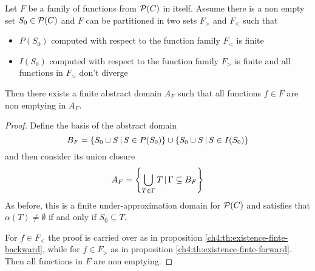 \begin{theorem}\label{ch4:th:existence-finite-backward-forward}
	Let $F$ be a family of functions from $\mathcal{P}(C)$ in itself. Assume there is a non empty set $S_0 \in \mathcal{P}(C)$ and $F$ can be partitioned in two sets $F_{>}$ and $F_{<}$ such that
	\begin{itemize}
		\item $P(S_0)$ computed with respect to the function family $F_{<}$ is finite
		\item $I(S_0)$ computed with respect to the function family $F_{>}$ is finite and all functions in  $F_{>}$ don't diverge
	\end{itemize}
	Then there exists a finite abstract domain $A_F$ such that all functions $f \in F$ are non emptying in $A_F$.
\end{theorem}
\begin{proof}
	Define the basis of the abstract domain
	\[
	B_F = \{ S_0 \cup S \,\vert\, S \in P(S_0) \} \cup \{ S_0 \cup S \,\vert\, S \in I(S_0) \}
	\]
	and then consider its union closure
	\[
	A_F = \left\lbrace \bigcup\limits_{T \in \Gamma} T \,\vert\, \Gamma \subseteq B_F \right\rbrace
	\]
	As before, this is a finite under-approximation domain for $\mathcal{P}(C)$ and satisfies that	$\alpha(T) \neq \emptyset$ if and only if $S_0 \subseteq T$.

	For $f \in F_{<}$ the proof is carried over as in proposition \ref{ch4:th:existence-finte-backward}, while for $f \in F_{>}$ as in proposition \ref{ch4:th:existence-finte-forward}. Then all functions in $F$ are non emptying.
\end{proof}

